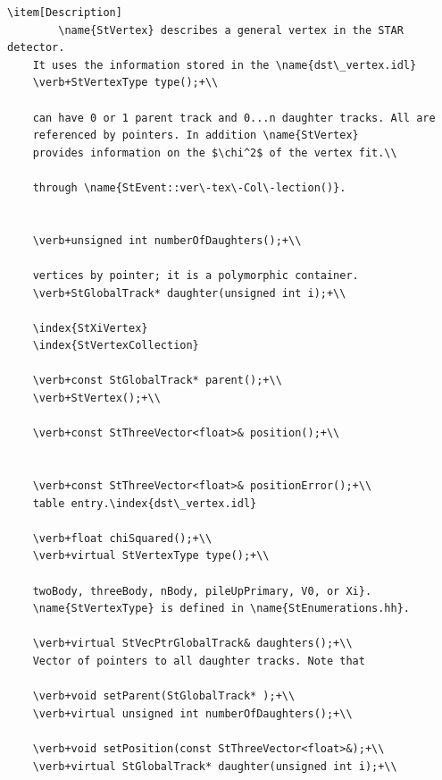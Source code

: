 \begin{enumerate}
\begin{Entry}
\begin{Entry}
{\begin{verbatim}
\item[Description]
        \name{StVertex} describes a general vertex in the STAR detector.
    It uses the information stored in the \name{dst\_vertex.idl}
    \verb+StVertexType type();+\\
    
    can have 0 or 1 parent track and 0...n daughter tracks. All are
    referenced by pointers. In addition \name{StVertex}
    provides information on the $\chi^2$ of the vertex fit.\\
    
    through \name{StEvent::ver\-tex\-Col\-lection()}.

    
    \verb+unsigned int numberOfDaughters();+\\

    vertices by pointer; it is a polymorphic container.
    \verb+StGlobalTrack* daughter(unsigned int i);+\\
    
    \index{StXiVertex}
    \index{StVertexCollection}
    
    \verb+const StGlobalTrack* parent();+\\
    \verb+StVertex();+\\
    
    \verb+const StThreeVector<float>& position();+\\

    
    \verb+const StThreeVector<float>& positionError();+\\
    table entry.\index{dst\_vertex.idl}
    
    \verb+float chiSquared();+\\        
    \verb+virtual StVertexType type();+\\
    
    twoBody, threeBody, nBody, pileUpPrimary, V0, or Xi}.
    \name{StVertexType} is defined in \name{StEnumerations.hh}.
    
    \verb+virtual StVecPtrGlobalTrack& daughters();+\\
    Vector of pointers to all daughter tracks. Note that
    
    \verb+void setParent(StGlobalTrack* );+\\
    \verb+virtual unsigned int numberOfDaughters();+\\
    
    \verb+void setPosition(const StThreeVector<float>&);+\\
    \verb+virtual StGlobalTrack* daughter(unsigned int i);+\\
    

\end{verbatim}}
\end{Entry}
\end{Entry}
\end{enumerate}

